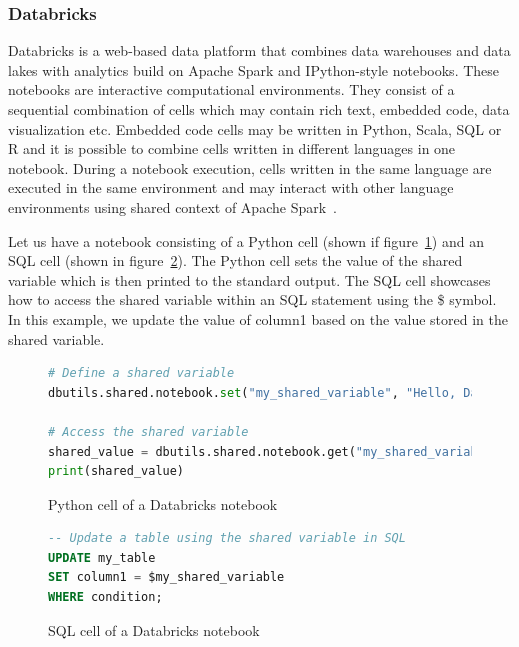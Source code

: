 \subsubsection{Databricks}
Databricks is a web-based data platform that combines data warehouses and data lakes with analytics build on Apache Spark and IPython-style notebooks. These notebooks are interactive computational environments. They consist of a sequential combination of cells which may contain rich text, embedded code, data visualization etc. Embedded code cells may be written in Python, Scala, SQL or R and it is possible to combine cells written in different languages in one notebook. During a notebook execution, cells written in the same language are executed in the same environment and may interact with other language environments using shared context of Apache Spark~\cite{databricks}.
\par
Let us have a notebook consisting of a Python cell (shown if figure~\ref{fig:pythonDatabricks}) and an SQL cell (shown in figure~\ref{fig:sqlDatabricks}). The Python cell sets the value of the shared variable which is then printed to the standard output. The SQL cell showcases how to access the shared variable within an SQL statement using the \$ symbol. In this example, we update the value of column1 based on the value stored in the shared variable.

\begin{figure}[ht]
\begin{lstlisting}[language=Python]
# Define a shared variable
dbutils.shared.notebook.set("my_shared_variable", "Hello, Databricks!")

# Access the shared variable
shared_value = dbutils.shared.notebook.get("my_shared_variable")
print(shared_value)
\end{lstlisting}
\caption{Python cell of a Databricks notebook}
\label{fig:pythonDatabricks}
\end{figure}

\begin{figure}[ht]
\begin{lstlisting}[language=SQL]
-- Update a table using the shared variable in SQL
UPDATE my_table
SET column1 = $my_shared_variable
WHERE condition;
\end{lstlisting}
\caption{SQL cell of a Databricks notebook}
\label{fig:sqlDatabricks}
\end{figure}

